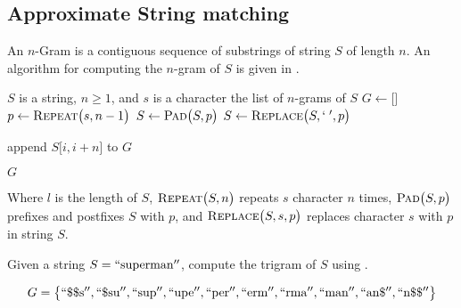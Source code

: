 	\subsection{Approximate String matching}
	\label{sec:n-gram}
		\begin{defn}[N-Gram]
			An $n$-Gram is a contiguous sequence of substrings of string $S$ of length $n$.  An algorithm for computing the $n$-gram of $S$ is given in . 
		\end{defn}
		

		\begin{algorithm}[!ht]
			\caption{$\textsc{N-Gram}\bigl(S, n, s\bigr)$}
			\label{alg:n-gram}
			
				\begin{algorithmic}[1]
					\REQUIRE $S$ is a string, $n \ge 1$, and $s$ is a character
					\ENSURE the list of $n$-grams of $S$
					\medskip
					\STATE $G \leftarrow \bigl[\bigr]$\label{alg:n-gram:G}
					\STATE $p \leftarrow \textsc{Repeat}\bigl(s, n - 1\bigr)$
					\STATE $S \leftarrow \textsc{Pad}\bigl(S, p\bigr)$
					\STATE $S \leftarrow \textsc{Replace}\bigl(S, `\;', p\bigr)$\label{alg:n-gram:S}
					
						\STATE append $S\bigl[i, i + n\bigr]$ to $G$
					\ENDFOR
					
					\RETURN $G$
				\end{algorithmic}
		\end{algorithm}
		
		
		Where $l$ is the length of $S$, $\textsc{Repeat}\bigl(S, n\bigr)$ repeats $s$ character $n$ times, $\textsc{Pad}\bigl(S, p\bigr)$ prefixes and postfixes $S$ with $p$, and $\textsc{Replace}\bigl(S, s, p\bigr)$ replaces character $s$ with $p$ in string $S$.
		
		\begin{ex}
		\label{ex:ngram-banana}
			Given a string $S = \mathrm{``superman''}$, compute the trigram of $S$ using .
			
			\[
				G = \bigl\{
					\mathrm{``\char"24\char"24s''},
					\mathrm{``\char"24su''},
					\mathrm{``sup''},
					\mathrm{``upe''},
					\mathrm{``per''},
					\mathrm{``erm''},
					\mathrm{``rma''},
					\mathrm{``man''},
					\mathrm{``an\char"24''},
					\mathrm{``n\char"24\char"24''}
				\bigr\}
			\]
		\end{ex}
		
